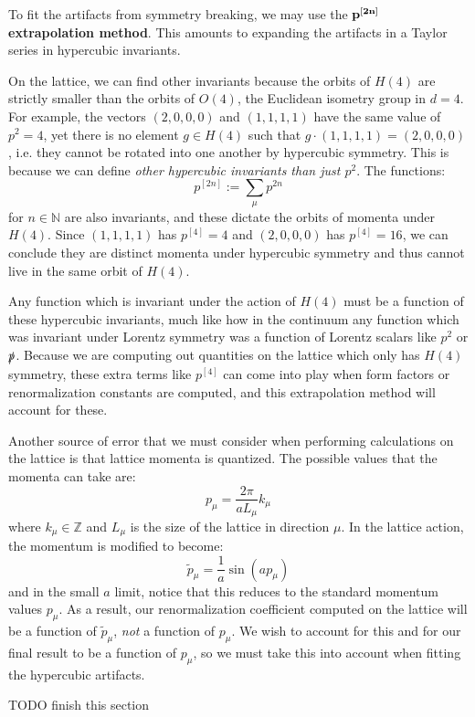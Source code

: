 \documentclass[11pt, oneside]{article}   	%
\theoremstyle{definition}
\begin{document}
To fit the artifacts from symmetry breaking, we may use the $\bf p^{[2n]}$ \textbf{extrapolation method}. This amounts to 
expanding the artifacts in a Taylor series in hypercubic invariants. 

On the lattice, we can find other invariants because the orbits of $H(4)$ are strictly smaller than the orbits of 
$O(4)$, the Euclidean isometry group in $d = 4$. For example, the vectors $(2, 0, 0, 0)$ and $(1, 1, 1, 1)$ have the same 
value of $p^2 = 4$, yet there is no element $g\in H(4)$ such that $g\cdot (1, 1, 1, 1) = (2, 0, 0, 0)$, i.e. they cannot be 
rotated into one another by hypercubic symmetry. This is because we can define \textit{other hypercubic invariants than 
just $p^2$}. The functions:
\begin{equation}
	p^{[2n]} := \sum_\mu p^{2n}
\end{equation}
for $n\in\mathbb N$ are also invariants, and these dictate the orbits of momenta under $H(4)$. Since $(1, 1, 1, 1)$ has 
$p^{[4]} = 4$ and $(2, 0, 0, 0)$ has $p^{[4]} = 16$, we can conclude they are distinct momenta under hypercubic 
symmetry and thus cannot live in the same orbit of $H(4)$. 

Any function which is invariant under the action of $H(4)$ must be a function of these hypercubic invariants, much like 
how in the continuum any function which was invariant under Lorentz symmetry was a function of Lorentz scalars like 
$p^2$ or $\slashed p$. Because we are computing out quantities on the lattice which only has $H(4)$ symmetry, these 
extra terms like $p^{[4]}$ can come into play when form factors or renormalization constants are computed, and this 
extrapolation method will account for these. 

Another source of error that we must consider when performing calculations on the lattice is that lattice momenta is quantized. 
The possible values that the momenta can take are:
\begin{equation}
	p_\mu = \frac{2\pi}{aL_\mu} k_\mu 
\end{equation}
where $k_\mu\in\mathbb Z$ and $L_\mu$ is the size of the lattice in direction $\mu$. In the lattice action, the momentum is 
modified to become:
\begin{equation}
	\tilde p_\mu = \frac{1}{a}\sin(ap_\mu)
\end{equation}
and in the small $a$ limit, notice that this reduces to the standard momentum values $p_\mu$. As a result, our renormalization 
coefficient computed on the lattice will be a function of $\tilde p_\mu$, \textit{not} a function of $p_\mu$. We wish to account 
for this and for our final result to be a function of $p_\mu$, so we must take this into account when fitting the hypercubic 
artifacts. 

TODO finish this section
\end{document}
